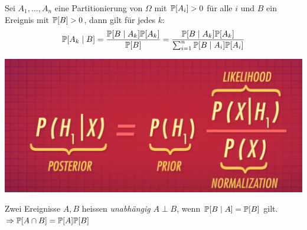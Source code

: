 \begin{theorem}
	Sei \(A_1,\ldots,A_n\) eine Partitionierung von \(\Omega\) mit \(\P[A_i] > 0\) für alle \(i\) und \(B\) ein Ereignis mit \(\P[B] > 0\), dann gilt für jedes \(k\):
	\[
		\P[A_k \mid B] = \frac{\P[B \mid A_k] \P[A_k]}{\P[B]}
		= \frac{\P[B \mid A_k] \P[A_k]}{\sum_{i=1}^n \P[B \mid A_i] \P[A_i]}
	\]
\end{theorem}

\includegraphics[width=.5\textwidth]{images/prior_posterior.png}


\begin{definition}[Unabhängigkeit]
	Zwei Ereignisse \(A,B\) heissen \emph{unabhängig} \(A \perp B\), wenn \(\P[B \mid A] = \P[B] \) gilt. \(\Rightarrow \P[A \cap B] = \P[A] \P[B]\)
\end{definition}
